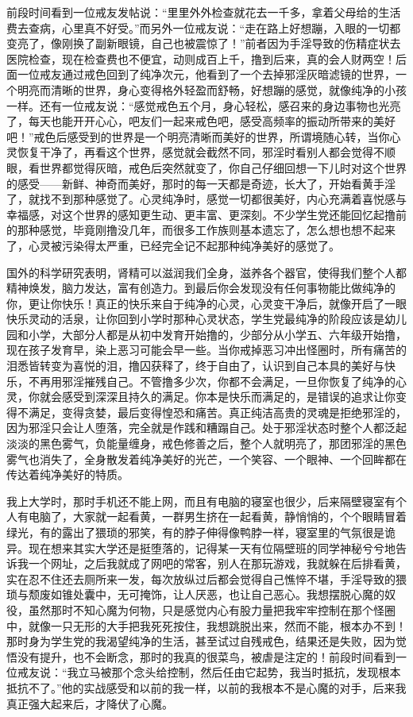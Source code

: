 前段时间看到一位戒友发帖说：“里里外外检查就花去一千多，拿着父母给的生活费去查病，心里真不好受。”而另外一位戒友说：“走在路上好想蹦，入眼的一切都变亮了，像刚换了副新眼镜，自己也被震惊了！”前者因为手淫导致的伤精症状去医院检查，现在检查费也不便宜，动则成百上千，撸到后来，真的会人财两空！后面一位戒友通过戒色回到了纯净次元，他看到了一个去掉邪淫灰暗滤镜的世界，一个明亮而清晰的世界，身心变得格外轻盈而舒畅，好想蹦的感觉，就像纯净的小孩一样。还有一位戒友说：“感觉戒色五个月，身心轻松，感召来的身边事物也光亮了，每天也能开开心心，吧友们一起来戒色吧，感受高频率的振动所带来的美好吧！”戒色后感受到的世界是一个明亮清晰而美好的世界，所谓境随心转，当你心灵恢复干净了，再看这个世界，感觉就会截然不同，邪淫时看别人都会觉得不顺眼，看世界都觉得灰暗，戒色后突然就变了，你自己仔细回想一下儿时对这个世界的感受——新鲜、神奇而美好，那时的每一天都是奇迹，长大了，开始看黄手淫了，就找不到那种感觉了。心灵纯净时，感觉一切都很美好，内心充满着喜悦感与幸福感，对这个世界的感知更生动、更丰富、更深刻。不少学生党还能回忆起撸前的那种感觉，毕竟刚撸没几年，而很多工作族则基本遗忘了，怎么想也想不起来了，心灵被污染得太严重，已经完全记不起那种纯净美好的感觉了。

国外的科学研究表明，肾精可以滋润我们全身，滋养各个器官，使得我们整个人都精神焕发，脑力发达，富有创造力。到最后你会发现没有任何事物能比做纯净的你，更让你快乐！真正的快乐来自于纯净的心灵，心灵变干净后，就像开启了一眼快乐灵动的活泉，让你回到小学时那种心灵状态，学生党最纯净的阶段应该是幼儿园和小学，大部分人都是从初中发育开始撸的，少部分从小学五、六年级开始撸，现在孩子发育早，染上恶习可能会早一些。当你戒掉恶习冲出怪圈时，所有痛苦的泪悉皆转变为喜悦的泪，撸囚获释了，终于自由了，认识到自己本具的美好与快乐，不再用邪淫摧残自己。不管撸多少次，你都不会满足，一旦你恢复了纯净的心灵，你就会感受到深深且持久的满足。你本是快乐而满足的，是错误的追求让你变得不满足，变得贪婪，最后变得惶恐和痛苦。真正纯洁高贵的灵魂是拒绝邪淫的，因为邪淫只会让人堕落，完全就是作践和糟蹋自己。处于邪淫状态时整个人都泛起淡淡的黑色雾气，负能量缠身，戒色修善之后，整个人就明亮了，那团邪淫的黑色雾气也消失了，全身散发着纯净美好的光芒，一个笑容、一个眼神、一个回眸都在传达着纯净美好的特质。

我上大学时，那时手机还不能上网，而且有电脑的寝室也很少，后来隔壁寝室有个人有电脑了，大家就一起看黄，一群男生挤在一起看黄，静悄悄的，个个眼睛冒着绿光，有的露出了猥琐的邪笑，有的脖子伸得像鸭脖一样，寝室里的气氛很是诡异。现在想来其实大学还是挺堕落的，记得某一天有位隔壁班的同学神秘兮兮地告诉我一个网址，之后我就成了网吧的常客，别人在那玩游戏，我就躲在后排看黄，实在忍不住还去厕所来一发，每次放纵过后都会觉得自己憔悴不堪，手淫导致的猥琐与颓废如锥处囊中，无可掩饰，让人厌恶，也让自己恶心。我想摆脱心魔的奴役，虽然那时不知心魔为何物，只是感觉内心有股力量把我牢牢控制在那个怪圈中，就像一只无形的大手把我死死按住，我想跳脱出来，然而不能，根本办不到！那时身为学生党的我渴望纯净的生活，甚至试过自残戒色，结果还是失败，因为觉悟没有提升，也不会断念，那时的我真的很菜鸟，被虐是注定的！前段时间看到一位戒友说：“我立马被那个念头给控制，然后任由它起势，我当时抵抗，发现根本抵抗不了。”他的实战感受和以前的我一样，以前的我根本不是心魔的对手，后来我真正强大起来后，才降伏了心魔。


